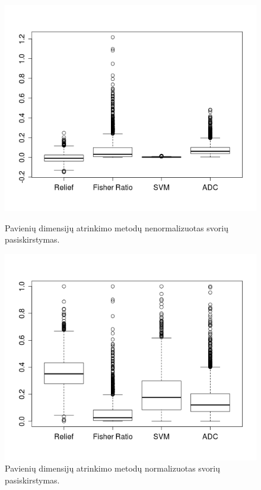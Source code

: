 \begin{figure}[ht]
\begin{minipage}[b]{0.5\linewidth}
\centering
\includegraphics[width=1\textwidth]{images/boxplot_colon_all.png}
\caption{Pavienių dimensijų atrinkimo metodų nenormalizuotas svorių
pasiskirstymas.}
\label{fig:figure1}
\end{minipage}
\hspace{0.5cm}
\begin{minipage}[b]{0.5\linewidth}
\centering
\includegraphics[width=1\textwidth]{images/boxplot_colon_all_normalized.png}
\caption{Pavienių dimensijų atrinkimo metodų normalizuotas svorių
pasiskirstymas.}
\label{fig:figure2}
\end{minipage}
\end{figure}

